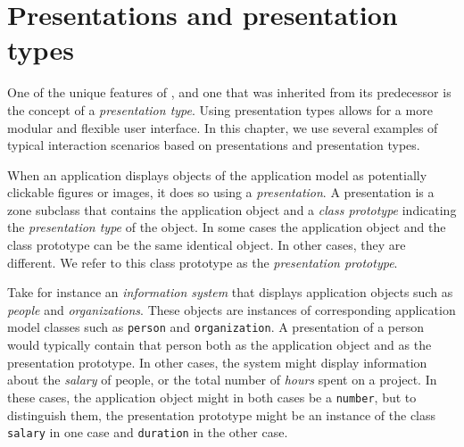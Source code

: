 \chapter{Presentations and presentation types}
\label{chap-presentations}

One of the unique features of \clim{}, and one that was inherited from
its predecessor \climtwo{} is the concept of a \emph{presentation
  type}.  Using presentation types allows for a more modular and
flexible user interface.  In this chapter, we use several examples of
typical interaction scenarios based on presentations and presentation
types. 

When an application displays objects of the application model as
potentially clickable figures or images, it does so using a
\emph{presentation}.  A presentation is a zone subclass that contains
the application object and a \emph{class prototype} indicating the
\emph{presentation type} of the object.  In some cases the application
object and the class prototype can be the same identical object.  In
other cases, they are different.  We refer to this class prototype as
the \emph{presentation prototype}. 

Take for instance an \emph{information system} that displays
application objects such as \emph{people} and \emph{organizations}.
These objects are instances of corresponding application model classes
such as \texttt{person} and \texttt{organization}.  A presentation of
a person would typically contain that person both as the application
object and as the presentation prototype.  In other cases, the system
might display information about the \emph{salary} of people, or the
total number of \emph{hours} spent on a project.  In these cases, the
application object might in both cases be a \cl{} \texttt{number}, but
to distinguish them, the presentation prototype might be an instance
of the class \texttt{salary} in one case and \texttt{duration} in the
other case.




